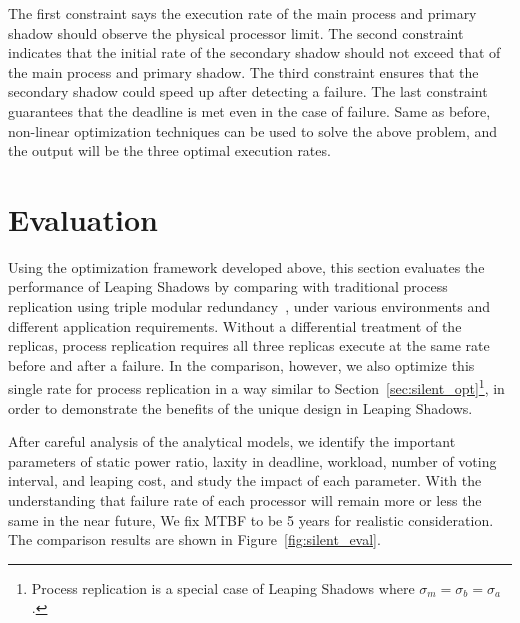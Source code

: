 The first constraint says the execution rate of the main process and primary shadow should observe the physical processor limit. The second constraint indicates that the initial rate of the secondary shadow should not exceed that of the main process and primary shadow. The third constraint ensures that the secondary shadow could speed up after detecting a failure. The last constraint guarantees that the deadline is met even in the case of failure. Same as before, non-linear optimization techniques can be used to solve the above problem, and the output will be the three optimal execution rates.

\section{Evaluation}
Using the optimization framework developed above, this section evaluates the performance of Leaping Shadows by comparing with traditional process replication using triple modular redundancy~\cite{fiala_2012_sdc}, under various environments and different application requirements. Without a differential treatment of the replicas, process replication requires all three replicas execute at the same rate before and after a failure. In the comparison, however, we also optimize this single rate for process replication in a way similar to Section~\ref{sec:silent_opt}\footnote{Process replication is a special case of Leaping Shadows where $\sigma_m = \sigma_b = \sigma_a$.}, in order to demonstrate the benefits of the unique design in Leaping Shadows. 

After careful analysis of the analytical models, we identify the important parameters of static power ratio, laxity in deadline, workload, number of voting interval, and leaping cost, and study the impact of each parameter. With the understanding that failure rate of each processor will remain more or less the same in the near future, We fix MTBF to be 5 years for realistic consideration. %
The comparison results are shown in Figure~\ref{fig:silent_eval}.

